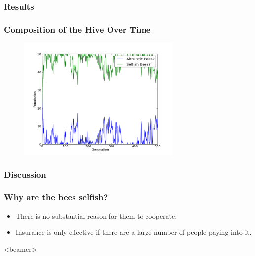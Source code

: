 \documentclass{beamer}
\begin{document}

      \subsubsection{Results} %
      \label{ssub:results}

        \begin{frame}[t]\frametitle{Composition of the Hive Over Time}
          \begin{figure}
          \includegraphics[width=8cm]{results/s_bees.png}
          \end{figure}
        \end{frame}
      

      \subsubsection{Discussion} %
      \label{ssub:discussion}
        \begin{frame}[c]\frametitle{Why are the bees selfish?}
            
          \begin{itemize}
            \item There is no substantial reason for them to cooperate.
            \item Insurance is only effective if there are a large number of
                  people paying into it.
          \end{itemize}
        
        \end{frame}

    \setcounter{tocdepth}{2}
      \begin{frame}<beamer>
      \end{frame}
    \setcounter{tocdepth}{3}
\end{document}
